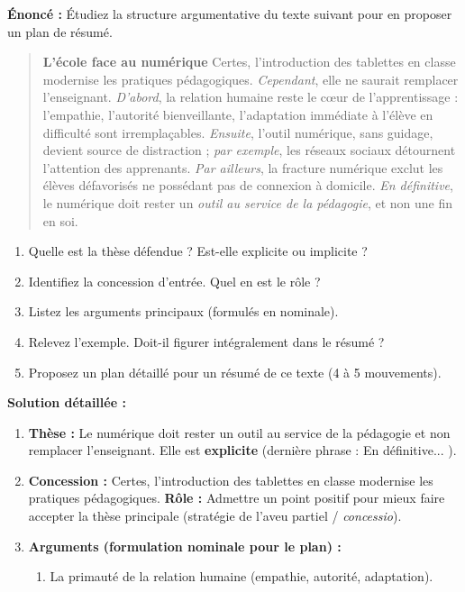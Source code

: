 \documentclass[11pt]{article}
\begin{document}
\begin{exoresolu}
\textbf{Énoncé :} Étudiez la structure argumentative du texte suivant pour en proposer un plan de résumé.
\begin{quote}
\textbf{L'école face au numérique}
\og Certes, l'introduction des tablettes en classe modernise les pratiques pédagogiques. \emph{Cependant}, elle ne saurait remplacer l'enseignant. \emph{D'abord}, la relation humaine reste le cœur de l'apprentissage : l'empathie, l'autorité bienveillante, l'adaptation immédiate à l'élève en difficulté sont irremplaçables. \emph{Ensuite}, l'outil numérique, sans guidage, devient source de distraction ; \emph{par exemple}, les réseaux sociaux détournent l'attention des apprenants. \emph{Par ailleurs}, la fracture numérique exclut les élèves défavorisés ne possédant pas de connexion à domicile. \emph{En définitive}, le numérique doit rester un \emph{outil au service de la pédagogie}, et non une fin en soi. \fg
\end{quote}
\begin{enumerate}
    \item Quelle est la thèse défendue ? Est-elle explicite ou implicite ?
    \item Identifiez la concession d'entrée. Quel en est le rôle ?
    \item Listez les arguments principaux (formulés en nominale).
    \item Relevez l'exemple. Doit-il figurer intégralement dans le résumé ?
    \item Proposez un plan détaillé pour un résumé de ce texte (4 à 5 mouvements).
\end{enumerate}
\tcblower
\textbf{Solution détaillée :}
\begin{enumerate}
    \item \textbf{Thèse :} \og Le numérique doit rester un outil au service de la pédagogie et non remplacer l'enseignant. \fg{} Elle est \textbf{explicite} (dernière phrase : \og En définitive... \fg{}).
    \item \textbf{Concession :} \og Certes, l'introduction des tablettes en classe modernise les pratiques pédagogiques. \fg{} \textbf{Rôle :} Admettre un point positif pour mieux faire accepter la thèse principale (stratégie de l'aveu partiel / \emph{concessio}).
    \item \textbf{Arguments (formulation nominale pour le plan) :}
    \begin{enumerate}
        \item La primauté de la relation humaine (empathie, autorité, adaptation).

\end{enumerate}
\end{enumerate}
\end{exoresolu}
\end{document}
